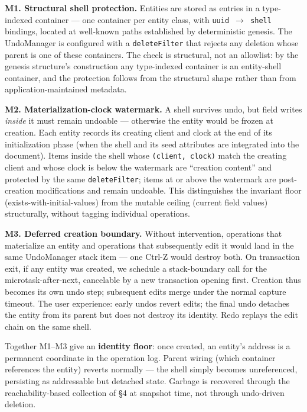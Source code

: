 \textbf{M1. Structural shell protection.} Entities are stored as entries in a type-indexed container --- one container per entity class, with \texttt{uuid $\rightarrow$ shell} bindings, located at well-known paths established by deterministic genesis\cite{plexus:genesis}. The UndoManager is configured with a \texttt{deleteFilter} that rejects any deletion whose parent is one of these containers. The check is structural, not an allowlist: by the genesis structure's construction any type-indexed container is an entity-shell container, and the protection follows from the structural shape rather than from application-maintained metadata.

\textbf{M2. Materialization-clock watermark.} A shell survives undo, but field writes \emph{inside} it must remain undoable --- otherwise the entity would be frozen at creation. Each entity records its creating client and clock at the end of its initialization phase (when the shell and its seed attributes are integrated into the document). Items inside the shell whose \texttt{(client, clock)} match the creating client and whose clock is below the watermark are ``creation content'' and protected by the same \texttt{deleteFilter}; items at or above the watermark are post-creation modifications and remain undoable. This distinguishes the invariant floor (exists-with-initial-values) from the mutable ceiling (current field values) structurally, without tagging individual operations.

\textbf{M3. Deferred creation boundary.} Without intervention, operations that materialize an entity and operations that subsequently edit it would land in the same UndoManager stack item --- one Ctrl-Z would destroy both. On transaction exit, if any entity was created, we schedule a stack-boundary call for the microtask-after-next, cancelable by a new transaction opening first. Creation thus becomes its own undo step; subsequent edits merge under the normal capture timeout. The user experience: early undos revert edits; the final undo detaches the entity from its parent but does not destroy its identity. Redo replays the edit chain on the same shell.

Together M1--M3 give an \textbf{identity floor}: once created, an entity's address is a permanent coordinate in the operation log. Parent wiring (which container references the entity) reverts normally --- the shell simply becomes unreferenced, persisting as addressable but detached state. Garbage is recovered through the reachability-based collection of \S4 at snapshot time, not through undo-driven deletion.

